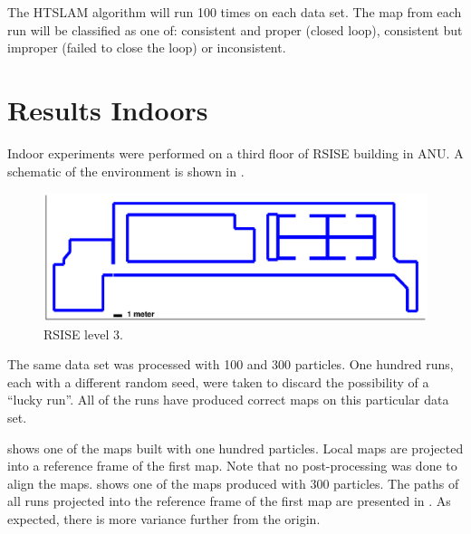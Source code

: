 The HTSLAM algorithm will run 100 times on each data set. The map from
each run will be classified as one of: consistent and proper (closed
loop), consistent but improper (failed to close the loop) or
inconsistent.


\section {Results Indoors}

Indoor experiments were performed on a third floor of RSISE building
in ANU. A schematic of the environment is shown in
.
 
\begin{figure}[htbp]
  \centering
  \includegraphics[width=13cm]{Pics/rsise_level3_map}
  \caption{RSISE level 3.}
  \label{fig:rsise_level3_map}
\end{figure}

The same data set was processed with 100 and 300 particles. One
hundred runs, each with a different random seed, were taken to discard
the possibility of a ``lucky run''. All of the runs have produced
correct maps on this particular data set.

 shows one of the maps built with
one hundred particles. Local maps are projected into a reference frame
of the first map. Note that no post-processing was done to align the
maps.  shows one of the maps produced
with 300 particles. The paths of all runs projected into the reference
frame of the first map are presented in
. As expected, there is more variance
further from the origin.


